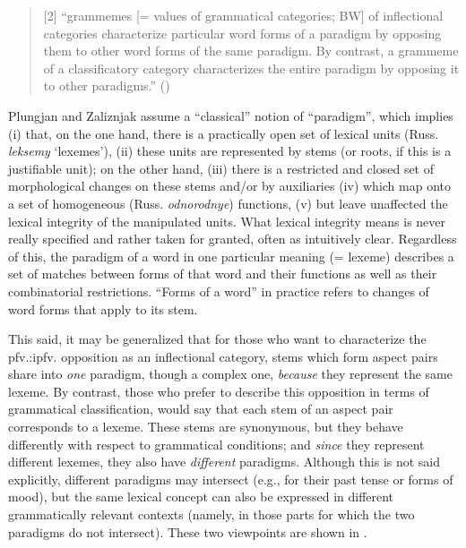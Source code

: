 \documentclass[output=paper]{langscibook}
\begin{document}
\begin{quote}
  [2] “grammemes [= values of grammatical categories; BW] of inflectional categories characterize     particular word forms of a paradigm by opposing them to other word forms of the same paradigm. By contrast, a grammeme of a classificatory category characterizes the entire paradigm by opposing it to other paradigms.”
    (\citealt[31--32; my translation]{Zaliznjak1967})
\end{quote}

Plungjan and Zaliznjak assume a “classical” notion of ``paradigm'', which implies (i) that, on the one hand, there is a practically open set of lexical units (Russ. \textit{leksemy} ‘lexemes’), (ii) these units are represented by stems (or roots, if this is a justifiable unit); on the other hand, (iii) there is a restricted and closed set of morphological changes on these stems and/or by auxiliaries (iv) which map onto a set of homogeneous (Russ. \textit{odnorodnye}) functions, (v) but leave unaffected the lexical integrity of the manipulated units. What lexical integrity means is never really specified and rather taken for granted, often as intuitively clear. Regardless of this, the paradigm of a word in one particular meaning (= lexeme) describes a set of matches between forms of that word and their functions as well as their combinatorial restrictions. ``Forms of a word'' in practice refers to changes of word forms that apply to its stem.

This said, it may be generalized that for those who want to characterize the pfv.:ipfv. opposition as an inflectional category, stems which form aspect pairs share into \emph{one} paradigm, though a complex one, \emph{because} they represent the same lexeme. By contrast, those who prefer to describe this opposition in terms of grammatical classification, would say that each stem of an aspect pair corresponds to a lexeme. These stems are synonymous, but they behave differently with respect to grammatical conditions; and \emph{since} they represent different lexemes, they also have \emph{different} paradigms. Although this is not said explicitly, different paradigms may intersect (e.g., for their past tense or forms of mood), but the same lexical concept can also be expressed in different grammatically relevant contexts (namely, in those parts for which the two paradigms do not intersect). These two viewpoints are shown in .
\end{document}
